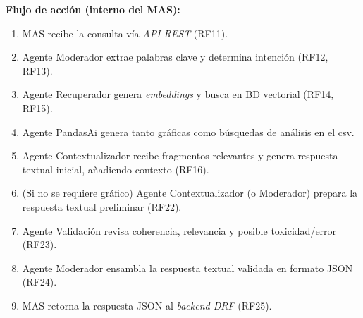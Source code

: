 \begin{userstory}[hu:09]
{		\textbf{Flujo de acción (interno del MAS):}
		\begin{enumerate}
			\item MAS recibe la consulta vía \textit{API REST} (RF11).
			\item Agente Moderador extrae palabras clave y determina intención (RF12, RF13).
			\item Agente Recuperador genera \textit{embeddings} y busca en BD vectorial (RF14, RF15).
			\item Agente PandasAi genera tanto gráficas como búsquedas de análisis en el csv.
			\item Agente Contextualizador recibe fragmentos relevantes y genera respuesta textual inicial, añadiendo contexto (RF16).
			\item (Si no se requiere gráfico) Agente Contextualizador (o Moderador) prepara la respuesta textual preliminar (RF22).
			\item Agente Validación revisa coherencia, relevancia y posible toxicidad/error (RF23).
			\item Agente Moderador ensambla la respuesta textual validada en formato JSON (RF24).
			\item MAS retorna la respuesta JSON al \textit{backend DRF} (RF25).
		\end{enumerate}
	}
	
\end{userstory}

